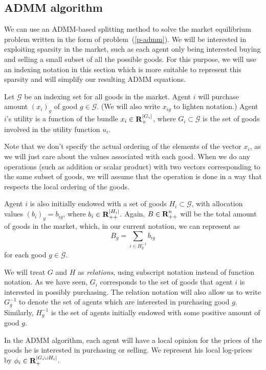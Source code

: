 \documentclass[12pt]{article}
\begin{document}
\subsection{ADMM algorithm}
We can use an ADMM-based splitting method \cite{boyd2011distributed} to
solve the market equilibrium problem written in the form of
problem~(\ref{p-admm}).
We will be interested in exploiting sparsity in the market, such
as each agent only being interested buying and selling a small subset 
of all the possible goods.
For this purpose, we will use an indexing notation in this section which is
more suitable to represent this sparsity and will simplify our resulting
ADMM equations.

Let $\mathcal{G}$ be an indexing set for all goods
in the market.
Agent $i$ will purchase amount $(x_i)_g$ of good $g \in \mathcal{G}$.
(We will also write $x_{ig}$ to lighten notation.)
Agent $i$'s utility is a function of the bundle $x_i \in {\mbox{\bf R}}_{+}^{|G_i|}$,
where $G_i \subset \mathcal{G}$ is the set of goods involved in the utility
function $u_i$.

Note that we don't specify the actual ordering of the elements
of the vector $x_i$, as we will just care about the values associated with
each good.
When we do any operations (such as addition or scalar product) with
two vectors corresponding to the same subset of goods, we will
assume that the operation is done in a way that respects the local ordering of
the goods.

Agent $i$ is also initially endowed with a set of goods
$H_i \subset \mathcal{G}$,
with allocation values $(b_i)_g = b_{ig}$, where $b_i \in {\mbox{\bf R}}_{++}^{|H_i|}$.
Again, $B \in {\mbox{\bf R}}^n_{++}$ will be the total amount of goods in the market, which, in our
current notation, we can represent as
\[
B_g = \sum\limits_{i \in H^{-1}_g} b_{ig}
\]
for each good $g \in \mathcal{G}$.

We will treat $G$ and $H$ as \emph{relations},
using subscript notation instead of function notation.
As we have seen, $G_i$ corresponds to the set of goods that agent $i$ is
interested
in possibly purchasing.
The relation notation will also allow us to
write $G^{-1}_g$ to denote the set of agents which are interested in
purchasing good $g$.
Similarly, $H^{-1}_g$ is the set of agents initially endowed with some
positive amount of good $g$.

In the ADMM algorithm, each agent will have a local opinion for the prices
of the goods he is interested in purchasing or selling.
We represent his local log-prices
by $\phi_i \in {\mbox{\bf R}}_+^{|G_i \cup H_i|}$.
\end{document}
